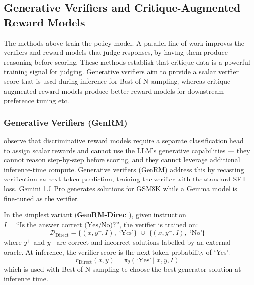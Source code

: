 \subsection{Generative Verifiers and Critique-Augmented Reward Models}
\label{sec:gen-verify}

The methods above train the policy model. A parallel line of work improves the verifiers and reward models that judge responses, by having them produce reasoning before scoring. These methods establish that critique data is a powerful training signal for judging. Generative verifiers aim to provide a scalar verifier score that is used during inference for Best-of-N sampling, whereas critique-augmented reward models produce better reward models for downstream preference tuning etc.

\subsubsection{Generative Verifiers (GenRM)}
\label{sec:genrm}

\autocite{zhang2024generativeverifiersrewardmodeling} observe that discriminative reward models require a separate classification head to assign scalar rewards and cannot use the LLM's generative capabilities --- they cannot reason step-by-step before scoring, and they cannot leverage additional inference-time compute. Generative verifiers (GenRM) address this by recasting verification as next-token prediction, training the verifier with the standard SFT loss. Gemini 1.0 Pro generates solutions for GSM8K while a Gemma model is fine-tuned as the verifier.

In the simplest variant (\textbf{GenRM-Direct}), given instruction $I = \text{``Is the answer correct (Yes/No)?''}$, the verifier is trained on:
\begin{equation}
    \mathcal{D}_{\text{Direct}} = \{(x, y^+, I),\; \text{`Yes'}\} \;\cup\; \{(x, y^-, I),\; \text{`No'}\}
    \label{eq:genrm_direct_data}
\end{equation}
where $y^+$ and $y^-$ are correct and incorrect solutions labelled by an external oracle. At inference, the verifier score is the next-token probability of `Yes':
\begin{equation}
    r_{\text{Direct}}(x, y) = \pi_\theta(\text{`Yes'} \mid x, y, I)
    \label{eq:genrm_direct_score}
\end{equation}
which is used with Best-of-N sampling to choose the best generator solution at inference time.

